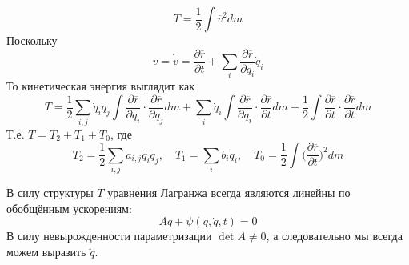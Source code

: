 \begin{property}
    \[T = \dfrac{1}{2} \int \overline{v}^2dm\]
    Поскольку \[\overline{v} = \dot{\overline{v}} = \dfrac{\partial \overline{r}}{\partial t} + \sum\limits_i\dfrac{\partial \overline{r}}{\partial q_i} \dot{q}_i\]
    То кинетическая энергия выглядит как \[
        T = \dfrac{1}{2}\sum\limits_{i, j}\dot{q}_i\dot{q}_j\int \dfrac{\partial \overline{r}}{\partial q_i}\cdot \dfrac{\partial \overline{r}}{\partial q_j}dm + \sum\limits_i \dot{q}_i \int \dfrac{\partial \overline{r}}{\partial q_i}\cdot \dfrac{\partial \overline{r}}{\partial t}dm + \dfrac{1}{2}\int \dfrac{\partial \overline{r}}{\partial t} \cdot \dfrac{\partial \overline{r}}{\partial t}dm
    \]
    Т.е. $T = T_2 + T_1 + T_0$, где 
    \[T_2 = \dfrac{1}{2}\sum\limits_{i, j}a_{i, j}\dot{q}_i\dot{q}_j, \quad T_1 = \sum\limits_i b_i \dot{q}_i, \quad T_0 = \dfrac{1}{2}\int \biggr(\dfrac{\partial \overline{r}}{\partial t}\biggr)^2 dm\]
\end{property}
\begin{property}
    В силу структуры $T$ уравнения Лагранжа всегда являются линейны по обобщённым ускорениям: \[A\ddot{q} + \psi(q, \dot{q}, t) = 0\]
    В силу невырожденности параметризации $\det A \neq 0$, а следовательно мы всегда можем выразить $\ddot{q}$.
\end{property}


